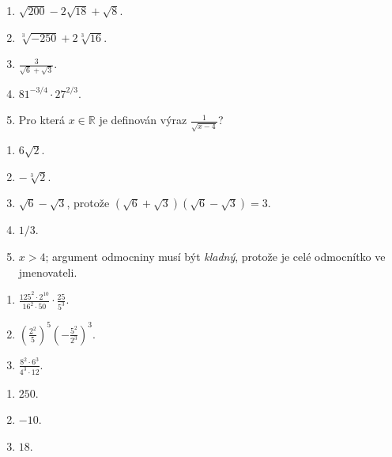 \documentclass[11pt,a4paper]{article}
\begin{document}
\begin{zadaniReseniBox}[title={Samostatná práce 3},breakable=false]
\begin{enumerate}[label=\alph*)]
\item $\sqrt{200}-2\sqrt{18}+\sqrt8$.
\item $\sqrt[3]{-250}+2\sqrt[3]{16}$.
\item $\displaystyle\frac3{\sqrt6+\sqrt3}$.
\item $81^{-3/4}\cdot27^{2/3}$.
\item Pro která $x\in\mathbb R$ je definován výraz
$\displaystyle\frac1{\sqrt{x-4}}$?
\end{enumerate}
\tcblower
\begin{enumerate}[label=\alph*)]
\item $\boxed{6\sqrt2}$.
\item $\boxed{-\sqrt[3]2}$.
\item $\boxed{\sqrt6-\sqrt3}$, protože
$(\sqrt6+\sqrt3)(\sqrt6-\sqrt3)=3$.
\item $\boxed{1/3}$.
\item $\boxed{x>4}$; argument odmocniny musí být \emph{kladný},
protože je celé odmocnítko ve jmenovateli.
\end{enumerate}
\end{zadaniReseniBox}

\begin{zadaniReseniBox}[title={Rozšíření 1},breakable=false]
\begin{enumerate}[label=\alph*)]
\item $\displaystyle\frac{125^2\cdot2^{10}}{16^2\cdot50}\cdot\frac{25}{5^3}$.
\item $\displaystyle\left(\frac{2^2}{5}\right)^5
\left(-\frac{5^2}{2^3}\right)^3$.
\item $\displaystyle\frac{8^2\cdot6^3}{4^3\cdot12}$.
\end{enumerate}
\tcblower
\begin{enumerate}[label=\alph*)]
\item $\boxed{250}$.
\item $\boxed{-10}$.
\item $\boxed{18}$.
\end{enumerate}
\end{zadaniReseniBox}
\end{document}
